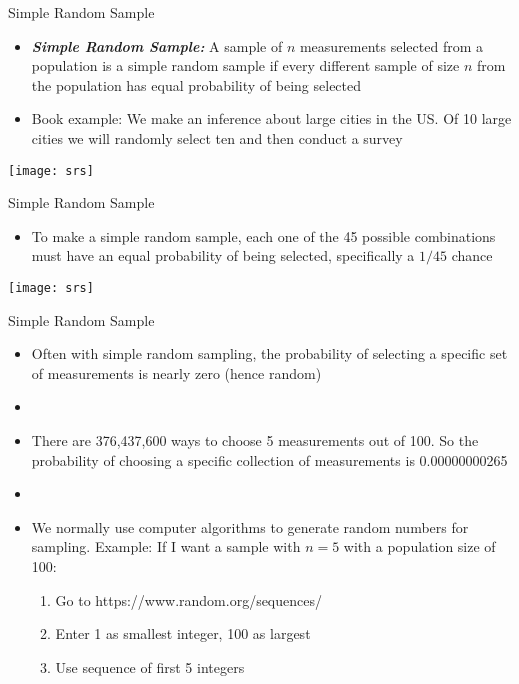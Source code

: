 \documentclass[xcolor=dvipsnames]{beamer}
\begin{document}
\begin{frame}{Simple Random Sample}
	\begin{itemize}
		\item \textbf{\emph{Simple Random Sample:}} A sample of $n$ measurements selected from a population is a simple random sample if every different sample of size $n$ from the population has equal probability of being selected
		\item Book example: We make an inference about large cities in the US. Of 10 large cities we will randomly select ten and then conduct a survey
	\end{itemize}
\begin{center}
	\texttt{[image: srs]}
\end{center}
\end{frame}

\begin{frame}{Simple Random Sample}
	\begin{itemize}
		\item To make a simple random sample, each one of the 45 possible combinations must have an equal probability of being selected, specifically a $1/45$ chance
	\end{itemize}
	\begin{center}
		\texttt{[image: srs]}
	\end{center}
\end{frame}

\begin{frame}{Simple Random Sample}
	\begin{itemize}
		\item Often with simple random sampling, the probability of selecting a specific set of measurements is nearly zero (hence random) 
		\item[]
		\item There are 376,437,600 ways to choose 5 measurements out of 100. So the probability of choosing a specific collection of measurements is 0.00000000265
		\item[]
		\item We normally use computer algorithms to generate random numbers for sampling. Example: If I want a sample with $n=5$ with a population size of 100:
		\begin{enumerate}
			\item Go to https://www.random.org/sequences/
			\item Enter 1 as smallest integer, 100 as largest
			\item Use sequence of first 5 integers
		\end{enumerate}
	\end{itemize}
\end{frame}
\end{document}
